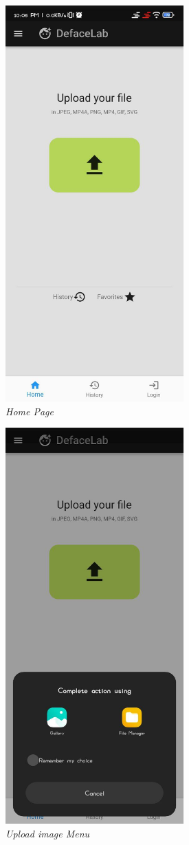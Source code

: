 \begin{figure}[ht]
    \centering
    \includegraphics[height =6in ]{img/homepage.jpg}
    \caption{\textit{Home Page}}
\end{figure}

\begin{figure}[ht]
    \centering
    \includegraphics[height =6in ]{img/uploader.jpg}
    \caption{\textit{Upload image Menu}}
\end{figure}


